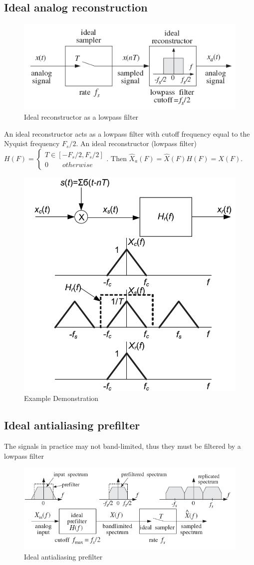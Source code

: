 \subsection{Ideal analog reconstruction}
\begin{figure}[h!]
    \centering
    \includegraphics[width=0.5\linewidth]{img/8.png}
    \caption{Ideal reconstructor as a lowpass filter}
\end{figure}
An ideal reconstructor acts as a lowpass filter with cutoff frequency equal to the Nyquist frequency $F_s/2$. An ideal reconstructor (lowpass filter)  $H(F) = \begin{cases}
        T \in [-F_s/2, F_s/2] \\
        0 \qquad otherwise
    \end{cases}$. Then $\widehat{X}_a (F) = \widehat{X}(F) H(F) = X(F)$.
\begin{figure}[h!]
    \centering
    \includegraphics[width=0.35\linewidth]{img/9.png}
    \caption{Example Demonstration}
\end{figure}
\subsection{Ideal antialiasing prefilter}
The signals in practice may not band-limited, thus they must be filtered by a lowpass filter
\begin{figure}[h!]
    \centering
    \includegraphics[width=0.6\linewidth]{img/10.png}
    \caption{Ideal antialiasing prefilter}
\end{figure}
